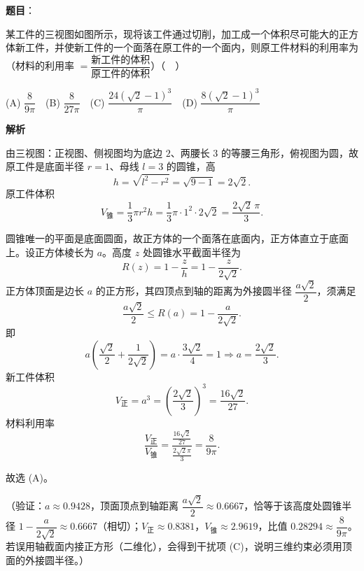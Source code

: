 \begin{answer}

\textbf{题目}：

某工件的三视图如图所示，现将该工件通过切削，加工成一个体积尽可能大的正方体新工件，并使新工件的一个面落在原工件的一个面内，则原工件材料的利用率为（材料的利用率 \(=\dfrac{\text{新工件的体积}}{\text{原工件的体积}}\)）（　）
\nopagebreak[4]
\begin{center}\end{center}
\nopagebreak[4]
(A) \(\dfrac{8}{9\pi}\)　(B) \(\dfrac{8}{27\pi}\)　(C) \(\dfrac{24(\sqrt2-1)^3}{\pi}\)　(D) \(\dfrac{8(\sqrt2-1)^3}{\pi}\)

\textbf{解析}

由三视图：正视图、侧视图均为底边 \(2\)、两腰长 \(3\) 的等腰三角形，俯视图为圆，故原工件是底面半径 \(r=1\)、母线 \(l=3\) 的圆锥，高
\nopagebreak[4]
\[
h=\sqrt{l^2-r^2}=\sqrt{9-1}=2\sqrt2.
\]
原工件体积
\nopagebreak[4]
\[
V_{\text{锥}}=\dfrac13\pi r^2h=\dfrac13\pi\cdot1^2\cdot2\sqrt2=\dfrac{2\sqrt2\,\pi}{3}.
\]

圆锥唯一的平面是底面圆面，故正方体的一个面落在底面内，正方体直立于底面上。设正方体棱长为 \(a\)。高度 \(z\) 处圆锥水平截面半径为
\nopagebreak[4]
\[
R(z)=1-\dfrac{z}{h}=1-\dfrac{z}{2\sqrt2}.
\]
正方体顶面是边长 \(a\) 的正方形，其四顶点到轴的距离为外接圆半径 \(\dfrac{a\sqrt2}{2}\)，须满足
\nopagebreak[4]
\[
\dfrac{a\sqrt2}{2}\leqslant R(a)=1-\dfrac{a}{2\sqrt2}.
\]
即
\nopagebreak[4]
\[
a\left(\dfrac{\sqrt2}{2}+\dfrac{1}{2\sqrt2}\right)=a\cdot\dfrac{3\sqrt2}{4}=1
\Longrightarrow a=\dfrac{2\sqrt2}{3}.
\]
新工件体积
\nopagebreak[4]
\[
V_{\text{正}}=a^3=\left(\dfrac{2\sqrt2}{3}\right)^3=\dfrac{16\sqrt2}{27}.
\]
材料利用率
\nopagebreak[4]
\[
\dfrac{V_{\text{正}}}{V_{\text{锥}}}
=\dfrac{\frac{16\sqrt2}{27}}{\frac{2\sqrt2\pi}{3}}
=\dfrac{8}{9\pi}.
\]

故选 (A)。

（验证：\(a\approx0.9428\)，顶面顶点到轴距离 \(\dfrac{a\sqrt2}{2}\approx0.6667\)，恰等于该高度处圆锥半径 \(1-\dfrac{a}{2\sqrt2}\approx0.6667\)（相切）；\(V_{\text{正}}\approx0.8381\)，\(V_{\text{锥}}\approx2.9619\)，比值 \(0.28294\approx\dfrac{8}{9\pi}\)。若误用轴截面内接正方形（二维化），会得到干扰项 (C)，说明三维约束必须用顶面的外接圆半径。）


\end{answer}
